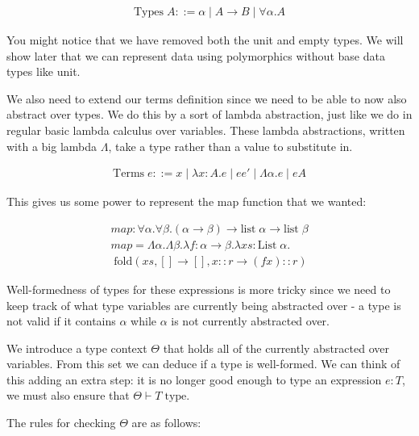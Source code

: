 \documentclass{article}
\newcommand{\inlineeq}[1]{
    \vspace{-2em}
    \begin{gather*}
    #1
    \end{gather*}
    \vspace{-2em}
}
\begin{document}
\inlineeq{
\textrm{Types} \; A ::= \alpha  \; | \; A \to B \; | \; \forall \alpha . A
}

You might notice that we have removed both the unit and empty types. We will show later that we can represent data using polymorphics without base data types like unit.

We also need to extend our terms definition since we need to be able to now also abstract over types. We do this by a sort of lambda abstraction, just like we do in regular basic lambda calculus over variables. These lambda abstractions, written with a big lambda $\Lambda$, take a type rather than a value to substitute in.

\inlineeq{
\textrm{Terms} \; e ::= x \; | \; \lambda x : A. e \; | \; e e' \; | \; \Lambda \alpha . e \; | \; e A
}

This gives us some power to represent the map function that we wanted:

\inlineeq{
map : \forall \alpha . \forall \beta . (\alpha  \to \beta ) \to \textrm{list} \; \alpha  \to \textrm{list} \; \beta  \\
map = \Lambda \alpha.\Lambda \beta. \lambda f:\alpha \to \beta. \lambda xs: \textrm{List} \; \alpha.\\ \; \textrm{fold}(xs, [] \to [], x :: r \to (f x) :: r)
}

Well-formedness of types for these expressions is more tricky since we need to keep track of what type variables are currently being abstracted over - a type is not valid if it contains $\alpha$ while $\alpha$ is not currently abstracted over.

We introduce a type context $\Theta$ that holds all of the currently abstracted over variables. From this set we can deduce if a type is well-formed. We can think of this adding an extra step: it is no longer good enough to type an expression $e:T$, we must also ensure that $\Theta  \vdash T \; \textrm{type}$.

\newpage
The rules for checking $\Theta$ are as follows:
\end{document}
